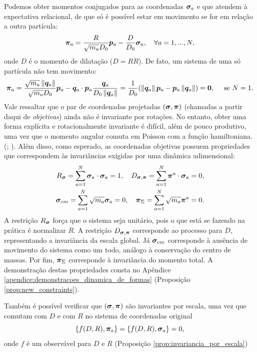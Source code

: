 Podemos obter momentos conjugados para as coordenadas $\bm \sigma_a$ e que atendem à expectativa relacional, de que só é possível estar em movimento se for em relação a outra partícula:
\begin{equation*}
    \bm \pi_a = \dfrac{R}{\sqrt{m_a} D_0} \bm p_a - \dfrac{D}{D_0} \bm \sigma_a, \quad \forall a = 1, ..., N,
\end{equation*}
onde $D$ é o momento de dilatação ($D = R \dot R $). De fato, um sistema de uma só partícula não tem movimento:
\begin{equation*}
    \bm \pi_a 
    = \dfrac{\sqrt{m_a} \left\Vert \bm q_a \right\Vert}{\sqrt{m_a} D_0} \bm p_a - \bm q_a \cdot \bm p_a \dfrac{\bm q_a}{D_0 \left\Vert \bm q_a \right\Vert}
    = \dfrac{1}{D_0} (\left\Vert \bm q_a \right\Vert \bm p_a - \bm p_a \left\Vert \bm q_a \right\Vert) 
    = \bm 0, \quad \text{ se } N = 1.
\end{equation*}
Vale ressaltar que o par de coordenadas projetadas $(\bm \sigma, \bm \pi)$ (chamadas a partir daqui de \textit{objetivas}) ainda não é invariante por rotações. No entanto, obter uma forma explícita e rotacionalmente invariante é difícil, além de pouco produtivo, uma vez que o momento angular comuta em Poisson com a função hamiltoniana. (\citealp[21]{barbour2013_gravitationaloriginarrowstime}; \citealp{Barbour2014_identification}). Além disso, como esperado, as coordenadas objetivas possuem propriedades que correspondem às invariâncias exigidas por uma dinâmica adimensional:
\begin{align}\label{eq:new_constraints}
    R_{\bm \sigma} = \sum_{a=1}^N \bm \sigma_a \cdot \bm \sigma_a = 1, \quad
    D_{\bm \sigma, \bm \pi} = \sum_{a=1}^N \bm \pi^a \cdot \bm \sigma_a = 0, \nonumber \\
    \bm \sigma_{cm} = \sum_{a=1}^N \sqrt{m_a} \bm \sigma_a = 0, \quad
    \bm \pi_{\Sigma} = \sum_{a=1}^N \sqrt{m_a} \bm \pi^a = 0.
\end{align}
A restrição $R_{\bm \sigma}$ força que o sistema seja unitário, pois o que está se fazendo na prática é normalizar $R$. A restrição $D_{\bm \sigma, \bm \pi}$ corresponde ao processo para $D$, representando a invariância da escala global. Já $\bm \sigma_{cm}$ corresponde à ausência de movimento do sistema como um todo, análogo à conservação do centro de massas. Por fim, $\bm \pi_{\Sigma}$ corresponde à invariância do momento total. A demonstração destas propriedades consta no Apêndice \ref{apendice:demonstracoes_dinamica_de_formas} (Proposição \ref{prop:new_constraints}).

Também é possível verificar que $(\bm \sigma, \bm \pi)$ são invariantes por escala, uma vez que comutam com $D$ e com $R$ no sistema de coordenadas original
\begin{equation}\label{eq:invariancia_por_escala}
    \{ f(D,R), \bm \pi_a \} = \{ f(D, R), \bm \sigma_a \} = 0,
\end{equation}
onde $f$ é um observável para $D$ e $R$ (Proposição \ref{prop:invariancia_por_escala})

